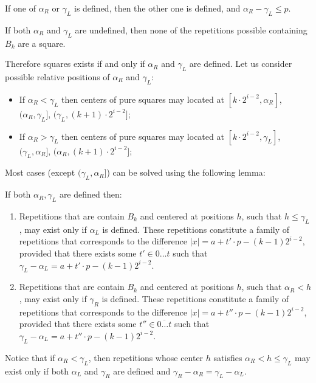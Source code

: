 ﻿\documentclass[11pt]{article}
\begin{document}
\begin{lem}[{\rm\cite{2}}]
If one of $\alpha_R$ or $\gamma_L$ is defined, then the other one is defined, and $\alpha_R - \gamma_L \leq p$.
\end{lem}

\begin{lem}[{\rm\cite{2}}]
If both $\alpha_R$ and $\gamma_L$ are undefined, then none of the repetitions possible containing $B_k$ are a
square.
\end{lem}

Therefore squares exists if and only if $\alpha_R$ and $\gamma_L$ are defined. Let us consider possible relative
positions of $\alpha_R$ and $\gamma_L$:
\begin{itemize}
\item If $\alpha_R < \gamma_L$ then centers of pure squares may located at $[k \cdot 2^{i-2}, \alpha_R]$, $(\alpha_R, \gamma_L]$, 
$(\gamma_L, (k+1)\cdot2^{i-2}]$;
\item If $\alpha_R > \gamma_L$ then centers of pure squares may located at $[k \cdot 2^{i-2}, \gamma_L]$, $(\gamma_L, \alpha_R]$, 
$(\alpha_R, (k+1)\cdot2^{i-2}]$;
\end{itemize}

Most cases (except $(\gamma_L, \alpha_R]$) can be solved using the following lemma:

\begin{lem}[{\rm\cite{2}}]
If both $\alpha_R, \gamma_L$ are defined then:

\begin{enumerate}
\item Repetitions that are contain $B_k$ and centered at positions $h$, such that $h \leq \gamma_L$, may exist only if
$\alpha_L$ is defined. These repetitions constitute a family of repetitions that corresponds to the difference
$|x| = a + t'\cdot p - (k-1)2^{i-2}$, provided that there exists some $t' \in \overline{0\dots t}$ such that
$\gamma_L - \alpha_L = a + t'\cdot p - (k-1)2^{i-2}$.
\item Repetitions that are contain $B_k$ and centered at positions $h$, such that $\alpha_R < h$, may exist only if
$\gamma_R$ is defined. These repetitions constitute a family of repetitions that corresponds to the difference
$|x| = a + t''\cdot p - (k-1)2^{i-2}$, provided that there exists some $t'' \in \overline{0\dots t}$ such that
$\gamma_L - \alpha_L = a + t''\cdot p - (k-1)2^{i-2}$.
\end{enumerate}
Notice that if $\alpha_R < \gamma_L$, then repetitions whose center $h$ satisfies $\alpha_R < h \leq\gamma_L$ may
exist only if both $\alpha_L$ and $\gamma_R$ are defined and $\gamma_R - \alpha_R = \gamma_L - \alpha_L$.
\end{lem}
\end{document}
